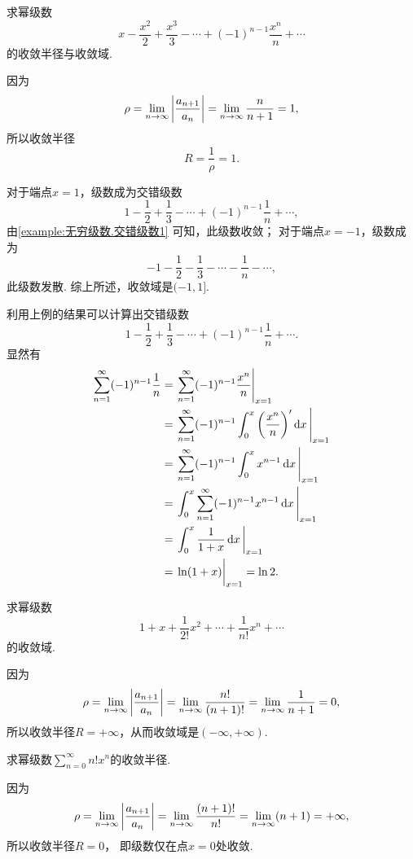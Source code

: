 \begin{example}
求幂级数\[
	x-\frac{x^2}{2}+\frac{x^3}{3}-\dotsb+(-1)^{n-1}\frac{x^n}{n}+\dotsb
\]的收敛半径与收敛域.
\begin{solution}
因为\[
	\rho = \lim_{n\to\infty} \abs{\frac{a_{n+1}}{a_n}}
	= \lim_{n\to\infty} \frac{n}{n+1} = 1,
\]
所以收敛半径\[
	R = \frac1\rho = 1.
\]

对于端点\(x=1\)，级数成为交错级数\[
	1-\frac{1}{2}+\frac{1}{3}-\dotsb+(-1)^{n-1}\frac{1}{n}+\dotsb,
\]
由\cref{example:无穷级数.交错级数1} 可知，此级数收敛；
对于端点\(x=-1\)，级数成为\[
	-1-\frac{1}{2}-\frac{1}{3}-\dotsb-\frac{1}{n}-\dotsb,
\]
此级数发散.
综上所述，收敛域是\((-1,1]\).
\end{solution}
\end{example}
利用上例的结果可以计算出交错级数\[
	1-\frac{1}{2}+\frac{1}{3}-\dotsb+(-1)^{n-1}\frac{1}{n}+\dotsb.
\]
显然有\begin{align*}
	\sum_{n=1}^\infty (-1)^{n-1} \frac{1}{n}
	&= \eval{\sum_{n=1}^\infty (-1)^{n-1} \frac{x^n}{n}}_{x=1} \\
	&= \eval{\sum_{n=1}^\infty (-1)^{n-1} \int_0^x \left(\frac{x^n}{n}\right)' \dd{x}}_{x=1} \\
	&= \eval{\sum_{n=1}^\infty (-1)^{n-1} \int_0^x x^{n-1} \dd{x}}_{x=1} \\
	&= \eval{\int_0^x \sum_{n=1}^\infty (-1)^{n-1} x^{n-1} \dd{x}}_{x=1} \\
	&= \eval{\int_0^x \frac{1}{1+x} \dd{x}}_{x=1} \\
	&= \eval{\ln(1+x)}_{x=1} = \ln2.
\end{align*}

\begin{example}
求幂级数\[
	1+x+\frac{1}{2!}x^2+\dotsb+\frac{1}{n!}x^n+\dotsb
\]的收敛域.
\begin{solution}
因为\[
	\rho = \lim_{n\to\infty} \abs{\frac{a_{n+1}}{a_n}}
	= \lim_{n\to\infty} \frac{n!}{(n+1)!}
	= \lim_{n\to\infty} \frac{1}{n+1}
	= 0,
\]
所以收敛半径\(R = +\infty\)，从而收敛域是\((-\infty,+\infty)\).
\end{solution}
\end{example}

\begin{example}
求幂级数\(\sum_{n=0}^\infty n! x^n\)的收敛半径.
\begin{solution}
因为\[
	\rho
	= \lim_{n\to\infty} \abs{\frac{a_{n+1}}{a_n}}
	= \lim_{n\to\infty} \frac{(n+1)!}{n!}
	= \lim_{n\to\infty} (n+1)
	= +\infty,
\]
所以收敛半径\(R = 0\)，
即级数仅在点\(x = 0\)处收敛.
\end{solution}
\end{example}

